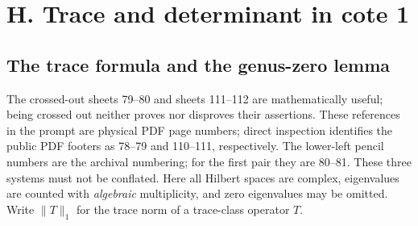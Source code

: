 \section{H. Trace and determinant in cote 1}
\label{sec:geometry-H}

\subsection{The trace formula and the genus-zero lemma}
The crossed-out sheets 79--80 and sheets 111--112 are mathematically useful;
being crossed out neither proves nor disproves their assertions. These
references in the prompt are physical PDF page numbers; direct inspection
identifies the public PDF footers as 78--79 and 110--111, respectively.
The lower-left pencil numbers are the archival numbering; for the first
pair they are 80--81. These three systems must not be conflated. Here all
Hilbert spaces are complex, eigenvalues are counted with \emph{algebraic}
multiplicity, and zero eigenvalues may be omitted. Write $\|T\|_1$ for the
trace norm of a trace-class operator $T$.


